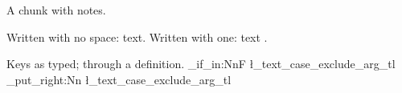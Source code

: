 A chunk with notes\flmCitePreSpace{}.

Written with no space: text\flmCitePreSpace{}. Written with one: text \flmCitePreSpace{}.

Keys as typed\flmCitePreSpace{}; through a definition\flmUDknuth.
\ProvideDocumentCommand{}
\ProvideDocumentCommand\flmCitePreSpace{}{\unskip~}
\ProvideDocumentCommand{}
\def\flm@cite@bookmark#1{\ifx[#1\expandafter\flm@cite@bookmark@note\fi}
\def\flm@cite@bookmark@note#1]#2{}
\AtBeginDocument{\ifdefined\pdfstringdefDisableCommands
  \pdfstringdefDisableCommands{%
    \def\flmCitePreSpace{}%
    \let\flmCite\flm@cite@bookmark
    \def\flmRefCite#1#2{}%
  }\fi}
\ExplSyntaxOn
\tl_if_in:NnF \l_text_case_exclude_arg_tl { \flmCite } { \tl_put_right:Nn \l_text_case_exclude_arg_tl { \flmCite } }
\ExplSyntaxOff
\providecommand\flmUDknuth{\flmCitePreSpace\flmCite{knuth_84}}
\endinput
